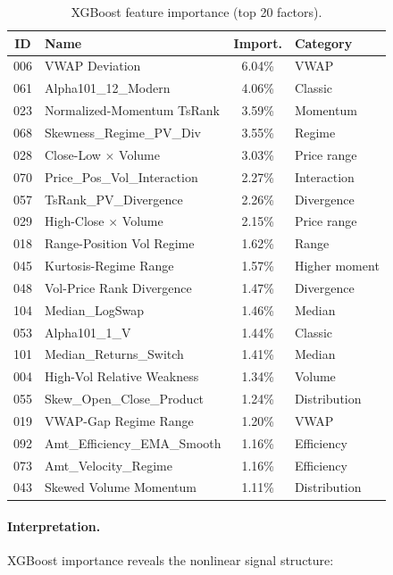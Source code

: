 \documentclass[sigconf]{acmart}
\begin{document}
\begin{table}[h]
  \caption{XGBoost feature importance (top 20 factors).}
  \centering
  \begin{small}
  \begin{tabular}{clcl}
    \toprule
    ID & Name & Import. & Category \\
    \midrule
    006 & VWAP Deviation & 6.04\% & VWAP \\
    061 & Alpha101\_12\_Modern & 4.06\% & Classic \\
    023 & Normalized-Momentum TsRank & 3.59\% & Momentum \\
    068 & Skewness\_Regime\_PV\_Div & 3.55\% & Regime \\
    028 & Close-Low $\times$ Volume & 3.03\% & Price range \\
    070 & Price\_Pos\_Vol\_Interaction & 2.27\% & Interaction \\
    057 & TsRank\_PV\_Divergence & 2.26\% & Divergence \\
    029 & High-Close $\times$ Volume & 2.15\% & Price range \\
    018 & Range-Position Vol Regime & 1.62\% & Range \\
    045 & Kurtosis-Regime Range & 1.57\% & Higher moment \\
    048 & Vol-Price Rank Divergence & 1.47\% & Divergence \\
    104 & Median\_LogSwap & 1.46\% & Median \\
    053 & Alpha101\_1\_V & 1.44\% & Classic \\
    101 & Median\_Returns\_Switch & 1.41\% & Median \\
    004 & High-Vol Relative Weakness & 1.34\% & Volume \\
    055 & Skew\_Open\_Close\_Product & 1.24\% & Distribution \\
    019 & VWAP-Gap Regime Range & 1.20\% & VWAP \\
    092 & Amt\_Efficiency\_EMA\_Smooth & 1.16\% & Efficiency \\
    073 & Amt\_Velocity\_Regime & 1.16\% & Efficiency \\
    043 & Skewed Volume Momentum & 1.11\% & Distribution \\
    \bottomrule
  \end{tabular}
  \end{small}
\end{table}

\paragraph{Interpretation.}
XGBoost importance reveals the nonlinear signal structure:
\end{document}
